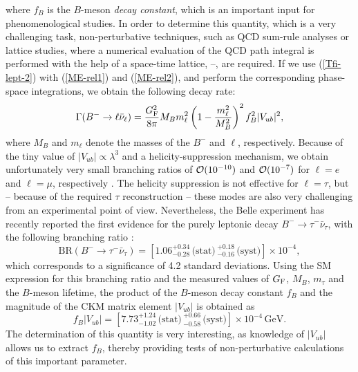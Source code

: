 \documentclass[12pt]{article}
\begin{document}
where $f_B$ is the $B$-meson {\it decay constant}, which is an important
input for phenomenological studies. In order to determine this
quantity, which is a very challenging task, non-perturbative 
techniques, such as QCD sum-rule analyses \cite{khodjamirian} or 
lattice studies, where a numerical evaluation of the QCD path integral is 
performed with the help of a space-time lattice, \cite{luscher}--\cite{luscher-rev}, 
are required.  If we use (\ref{Tfi-lept-2}) with (\ref{ME-rel1}) and 
(\ref{ME-rel2}), and perform the corresponding phase-space integrations, 
we obtain the following decay rate:
\begin{equation}
\Gamma(B^-\to\ell \bar \nu_\ell)=\frac{G_{\rm F}^2}{8\pi}
M_Bm_\ell^2\left(1-\frac{m_\ell^2}{M_B^2}\right)^2f_B^2|V_{ub}|^2 ,
\end{equation}
where $M_B$ and $m_\ell$ denote the masses of the $B^-$ and $\ell$,
respectively. Because of the tiny value of $|V_{ub}|\propto\lambda^3$ 
and a helicity-suppression mechanism, we obtain unfortunately very small 
branching ratios of ${\cal O}(10^{-10})$ and ${\cal O}(10^{-7})$ for 
$\ell=e$ and $\ell=\mu$, respectively \cite{fulvia}. The helicity 
suppression is not effective for $\ell=\tau$, but -- because of the 
required $\tau$ reconstruction -- these modes are also very challenging from 
an experimental point of view. Nevertheless, the Belle experiment has recently
reported the first evidence for the purely leptonic decay 
$B^- \to \tau^- \bar\nu_\tau$, with the following branching ratio \cite{Belle-leptonic}:
\begin{equation}
\mbox{BR}(B^- \to \tau^- \bar\nu_\tau) = \left[1.06 ^{+0.34}_{-0.28} \,
\mbox{(stat)} \,  ^{+0.18}_{-0.16} \, \mbox{(syst)}\right]\times 10^{-4},
\end{equation}
which corresponds to a significance of 4.2 standard deviations. Using the
SM expression for this branching ratio and the measured values of
$G_{\rm F}$, $M_B$, $m_\tau$ and the $B$-meson lifetime, the 
product of the $B$-meson decay constant $f_B$ and the magnitude of the
CKM matrix element $|V_{ub}|$ is obtained as
\begin{equation}%
f_B|V_{ub}|=\left[7.73^{+1.24}_{-1.02}\,
\mbox{(stat)} \,  ^{+0.66}_{-0.58} \, \mbox{(syst)}\right]\times 10^{-4} \, \mbox{GeV}.
\end{equation}
The determination of this quantity is very interesting, as knowledge of $|V_{ub}|$
allows us to extract $f_B$, thereby providing tests of non-perturbative calculations 
of this important parameter. 
\end{document}
